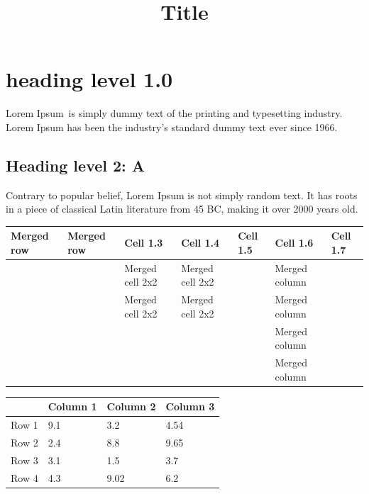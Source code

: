 \documentclass[11pt,a4paper]{article}
\title{Title}
\begin{document}
\maketitle

\section{heading level 1.0}

Lorem Ipsum is simply dummy text of the printing and typesetting industry. Lorem Ipsum has been the industry's standard dummy text ever since 1966.

\subsection{Heading level 2: A}

Contrary to popular belief, Lorem Ipsum is not simply random text. It has roots in a piece of classical Latin literature from 45 BC, making it over 2000 years old.

\begin{table}[h]
\begin{tabular}{|l|l|l|l|l|l|l|}
\hline
Merged row & Merged row & Cell 1.3 & Cell 1.4 & Cell 1.5 & Cell 1.6 & Cell 1.7 \\ \hline
 &  & Merged cell 2x2 & Merged cell 2x2 &  & Merged column &  \\ \hline
 &  & Merged cell 2x2 & Merged cell 2x2 &  & Merged column &  \\ \hline
 &  &  &  &  & Merged column &  \\ \hline
 &  &  &  &  & Merged column &  \\ \hline
\end{tabular}
\end{table}

\begin{figure}[h]
\end{figure}

\begin{table}[h]
\begin{tabular}{|l|l|l|l|}
\hline
 & Column 1 & Column 2 & Column 3 \\ \hline
Row 1 & 9.1 & 3.2 & 4.54 \\ \hline
Row 2 & 2.4 & 8.8 & 9.65 \\ \hline
Row 3 & 3.1 & 1.5 & 3.7 \\ \hline
Row 4 & 4.3 & 9.02 & 6.2 \\ \hline
\end{tabular}
\end{table}

\begin{figure}[h]
\end{figure}
\end{document}
